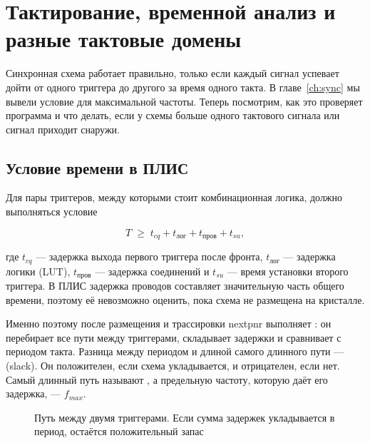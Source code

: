 \chapter{Тактирование, временной анализ и разные тактовые домены}
\label{ch:clocks}

Синхронная схема работает правильно, только если каждый сигнал успевает дойти
от одного триггера до другого за время одного такта. В главе~\ref{ch:sync} мы
вывели условие для максимальной частоты. Теперь посмотрим, как это проверяет
программа и что делать, если у схемы больше одного тактового сигнала или
сигнал приходит снаружи.

\section{Условие времени в ПЛИС}

Для пары триггеров, между которыми стоит комбинационная логика, должно
выполняться условие

\[
T \;\ge\; t_{cq} + t_{\text{лог}} + t_{\text{пров}} + t_{su},
\]

где $t_{cq}$ --- задержка выхода первого триггера после фронта, $t_{\text{лог}}$ ---
задержка логики (LUT), $t_{\text{пров}}$ --- задержка соединений и $t_{su}$ --- время
установки второго триггера. В ПЛИС задержка проводов составляет значительную
часть общего времени, поэтому её невозможно оценить, пока схема не размещена
на кристалле.

Именно поэтому после размещения и трассировки nextpnr выполняет
: он перебирает все пути между
триггерами, складывает задержки и сравнивает с периодом такта. Разница
между периодом и длиной самого длинного пути ---  (slack). Он
положителен, если схема укладывается, и отрицателен, если нет. Самый длинный
путь называют , а предельную частоту, которую даёт его
задержка, --- $f_{max}$.

\begin{figure}[H]
\centering
{}
\caption{Путь между двумя триггерами. Если сумма задержек укладывается в период, остаётся положительный запас}
\end{figure}

